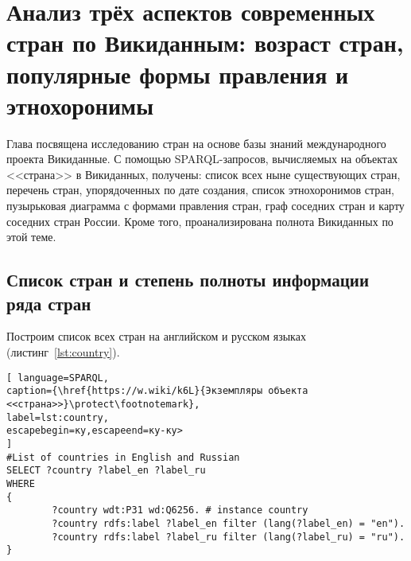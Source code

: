 \chapter[Анализ стран: возраст, формы правления и этнохоронимы]{Анализ трёх аспектов современных стран по Викиданным: возраст стран, популярные формы правления и этнохоронимы}
\label{ch:country}

Глава посвящена исследованию стран на основе базы знаний международного проекта Викиданные. С помощью SPARQL-запросов, вычисляемых на объектах <<страна>> в Викиданных, получены: список всех ныне существующих стран, перечень стран, упорядоченных по дате создания, список этнохоронимов стран, пузырьковая диаграмма с формами правления стран, граф соседних стран и карту соседних стран России. Кроме того, проанализирована полнота Викиданных по этой теме.

\begin{marginfigure}[0.0cm]
	{
		\setlength{\fboxsep}{0pt}%
		\setlength{\fboxrule}{1pt}%
	}
	\caption{
		Высокая степень заполнения по числу свойств объекта Викиданных \href{https://www.wikidata.org/wiki/Q6256}{страна (Q6256)}.  Данные получены с помощью сервиса \href{https://prowd.id/dashboards/86b6f91a8131/profile}{ProWD.id}, 2020 год. \emph{Коэффициент Джини равен 0.091.}
	}%
	\label{fig:ProWD_country}%
\end{marginfigure}


\section{Список стран и степень полноты информации ряда стран}

Построим список всех стран на английском и русском языках (листинг~\ref{lst:country}).

\begin{lstlisting}[ language=SPARQL, 
caption={\href{https://w.wiki/k6L}{Экземпляры объекта <<страна>>}\protect\footnotemark},
label=lst:country, 
escapebegin=ку,escapeend=ку-ку>
]
#List of countries in English and Russian
SELECT ?country ?label_en ?label_ru
WHERE
{
		?country wdt:P31 wd:Q6256. # instance country
		?country rdfs:label ?label_en filter (lang(?label_en) = "en").
		?country rdfs:label ?label_ru filter (lang(?label_ru) = "ru").
}
\end{lstlisting}


